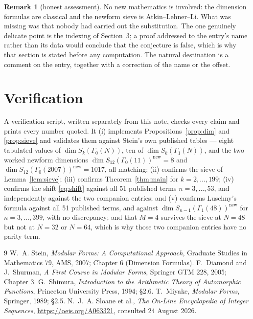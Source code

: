 \documentclass[11pt,a4paper]{article}
\theoremstyle{plain}
\theoremstyle{definition}
\newtheorem*{remark}{Remark}
\begin{document}
\begin{remark}[honest assessment]
No new mathematics is involved: the dimension formulas are classical and the newform sieve
is Atkin--Lehner--Li. What was missing was that nobody had carried out the substitution.
The one genuinely delicate point is the indexing of Section~3; a proof addressed to the
entry's name rather than its data would conclude that the conjecture is false, which is why
that section is stated before any computation. The natural destination is a comment on the
entry, together with a correction of the name or the offset.
\end{remark}

\section{Verification}

A verification script, written separately from this note, checks every claim and prints
every number quoted. It (i) implements Propositions~\ref{prop:dim} and \ref{prop:sieve} and
validates them against Stein's own published tables --- eight tabulated values of
$\dim S_{k}(\Gamma_{0}(N))$, ten of $\dim S_{k}(\Gamma_{1}(N))$, and the two worked newform
dimensions $\dim S_{12}(\Gamma_{0}(11))^{\mathrm{new}}=8$ and
$\dim S_{12}(\Gamma_{0}(2007))^{\mathrm{new}}=1017$, all matching; (ii) confirms the sieve
of Lemma~\ref{lem:sieve}; (iii) confirms Theorem~\ref{thm:main} for $k=2,\dots,199$;
(iv) confirms the shift \eqref{eq:shift} against all 51 published terms $n=3,\dots,53$, and
independently against the two companion entries; and (v) confirms Luschny's formula against
all 51 published terms, and against $\dim S_{n-1}(\Gamma_{1}(48))^{\mathrm{new}}$ for
$n=3,\dots,399$, with no discrepancy; and that $M=4$ survives the sieve at $N=48$ but not
at $N=32$ or $N=64$, which is why those two companion entries have no parity term.

\begin{thebibliography}{9}
 W.~A. Stein, \emph{Modular Forms: A Computational Approach}, Graduate
Studies in Mathematics 79, AMS, 2007; Chapter 6 (Dimension Formulas).
 F.~Diamond and J.~Shurman, \emph{A First Course in Modular Forms}, Springer
GTM 228, 2005; Chapter 3.
 G.~Shimura, \emph{Introduction to the Arithmetic Theory of Automorphic
Functions}, Princeton University Press, 1994; \S2.6.
 T.~Miyake, \emph{Modular Forms}, Springer, 1989; \S2.5.
 N.~J.~A. Sloane et al., \emph{The On-Line Encyclopedia of Integer
Sequences}, \url{https://oeis.org/A063321}, consulted 24 August 2026.
\end{thebibliography}
\end{document}

